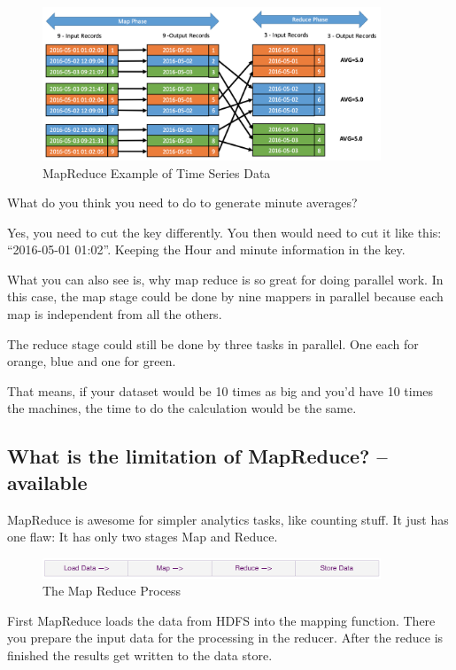 \documentclass[12pt, numbers=noenddot]{scrreprt} %
\begin{document}
\begin{figure}[htbp]
  \centering
     \includegraphics[width=0.9\textwidth]{images/MapReduce-Time-Series-example}
  \caption{MapReduce Example of Time Series Data}
  \label{fig:Bild1}
\end{figure}

What do you think you need to do to generate minute averages?

Yes, you need to cut the key differently. You then would need to cut it like this: “2016-05-01 01:02”. Keeping the Hour and minute information in the key.

What you can also see is, why map reduce is so great for doing parallel work. In this case, the map stage could be done by nine mappers in parallel because each map is independent from all the others.

The reduce stage could still be done by three tasks in parallel. One each for orange, blue and one for green.

That means, if your dataset would be 10 times as big and you’d have 10 times the machines, the time to do the calculation would be the same.

\subsection{What is the limitation of MapReduce? -- available}
MapReduce is awesome for simpler analytics tasks, like counting stuff. It just has one flaw: It has only two stages Map and Reduce.

\begin{figure}[htbp]
  \centering
     \includegraphics[width=0.9\textwidth]{images/MapReduce-Process}
  \caption{The Map Reduce Process}
  \label{fig:Bild1}
\end{figure}

First MapReduce loads the data from HDFS into the mapping function. There you prepare the input data for the processing in the reducer. After the reduce is finished the results get written to the data store.
\end{document}
